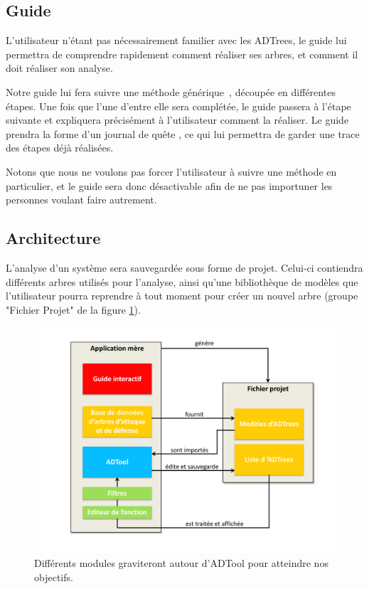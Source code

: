     \subsection{Guide}
        \label{sec:guide}

        L'utilisateur n'étant pas nécessairement familier avec les ADTrees, le guide lui permettra de comprendre rapidement comment réaliser ses arbres, et comment il doit réaliser son analyse.

        Notre guide lui fera suivre une méthode générique~\cite{methode_analyse}, découpée en différentes étapes. Une fois que l'une d'entre elle sera complétée, le guide passera à l'étape suivante et expliquera précisément à l'utilisateur comment la réaliser.
        Le guide prendra la forme d'un \og journal de quête \fg, ce qui lui permettra de garder une trace des étapes déjà réalisées.
        
        Notons que nous ne voulons pas forcer l'utilisateur à suivre une méthode en particulier, et le guide sera donc désactivable afin de ne pas importuner les personnes voulant faire autrement. %

    \subsection{Architecture}
        \label{sec:archi}


        L'analyse d'un système sera sauvegardée sous forme de projet. Celui-ci contiendra différents arbres utilisés pour l'analyse, ainsi qu'une bibliothèque de modèles que l'utilisateur pourra reprendre à tout moment pour créer un nouvel arbre (groupe "Fichier Projet" de la figure \ref{fig:archi}). 

        \begin{figure}
            \begin{center}
                \includegraphics[width=1\textwidth]{figure/archi.pdf}
            \end{center}
            \caption{Différents modules graviteront autour d'ADTool pour atteindre nos objectifs.}
            \label{fig:archi}
        \end{figure}

